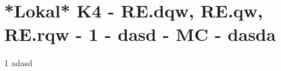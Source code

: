 \section{*Lokal* K4 - RE.dqw, RE.qw, RE.rqw - 1 - dasd - MC - dasda}

\begin{langesbeispiel}\item[1] %
adasd

\end{langesbeispiel}